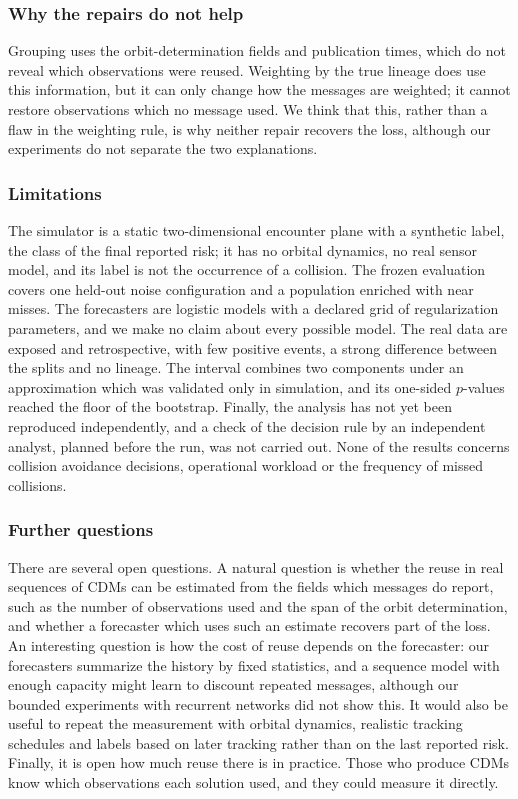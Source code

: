 \documentclass[conference]{IEEEtran}
\begin{document}
\subsubsection*{Why the repairs do not help}
Grouping uses the orbit-determination fields and publication times, which do not reveal which observations were reused. Weighting by the true lineage does use this information, but it can only change how the messages are weighted; it cannot restore observations which no message used. We think that this, rather than a flaw in the weighting rule, is why neither repair recovers the loss, although our experiments do not separate the two explanations.

\subsubsection*{Limitations}
The simulator is a static two-dimensional encounter plane with a synthetic label, the class of the final reported risk; it has no orbital dynamics, no real sensor model, and its label is not the occurrence of a collision. The frozen evaluation covers one held-out noise configuration and a population enriched with near misses. The forecasters are logistic models with a declared grid of regularization parameters, and we make no claim about every possible model. The real data are exposed and retrospective, with few positive events, a strong difference between the splits and no lineage. The interval combines two components under an approximation which was validated only in simulation, and its one-sided $p$-values reached the floor of the bootstrap. Finally, the analysis has not yet been reproduced independently, and a check of the decision rule by an independent analyst, planned before the run, was not carried out. None of the results concerns collision avoidance decisions, operational workload or the frequency of missed collisions.

\subsubsection*{Further questions}
There are several open questions. A natural question is whether the reuse in real sequences of CDMs can be estimated from the fields which messages do report, such as the number of observations used and the span of the orbit determination, and whether a forecaster which uses such an estimate recovers part of the loss. An interesting question is how the cost of reuse depends on the forecaster: our forecasters summarize the history by fixed statistics, and a sequence model with enough capacity might learn to discount repeated messages, although our bounded experiments with recurrent networks did not show this. It would also be useful to repeat the measurement with orbital dynamics, realistic tracking schedules and labels based on later tracking rather than on the last reported risk. Finally, it is open how much reuse there is in practice. Those who produce CDMs know which observations each solution used, and they could measure it directly.
\end{document}

